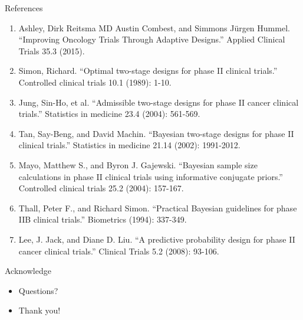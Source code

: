 \begin{frame}{References}

\begin{enumerate}
\def\labelenumi{\arabic{enumi}.}
\item
  Ashley, Dirk Reitsma MD Austin Combest, and Simmons Jürgen Hummel.
  ``Improving Oncology Trials Through Adaptive Designs.'' Applied
  Clinical Trials 35.3 (2015).
\item
  Simon, Richard. ``Optimal two-stage designs for phase II clinical
  trials.'' Controlled clinical trials 10.1 (1989): 1-10.
\item
  Jung, Sin-Ho, et al. ``Admissible two-stage designs for phase II
  cancer clinical trials.'' Statistics in medicine 23.4 (2004): 561-569.
\item
  Tan, Say-Beng, and David Machin. ``Bayesian two-stage designs for
  phase II clinical trials.'' Statistics in medicine 21.14 (2002):
  1991-2012.
\item
  Mayo, Matthew S., and Byron J. Gajewski. ``Bayesian sample size
  calculations in phase II clinical trials using informative conjugate
  priors.'' Controlled clinical trials 25.2 (2004): 157-167.
\item
  Thall, Peter F., and Richard Simon. ``Practical Bayesian guidelines
  for phase IIB clinical trials.'' Biometrics (1994): 337-349.
\item
  Lee, J. Jack, and Diane D. Liu. ``A predictive probability design for
  phase II cancer clinical trials.'' Clinical Trials 5.2 (2008): 93-106.
\end{enumerate}

\end{frame}

\begin{frame}{Acknowledge}

\end{frame}

\begin{frame}

\begin{itemize}[<+->]
\tightlist
\item
  Questions?
\end{itemize}

\begin{itemize}[<+->]
\tightlist
\item
  Thank you!
\end{itemize}

\end{frame}
